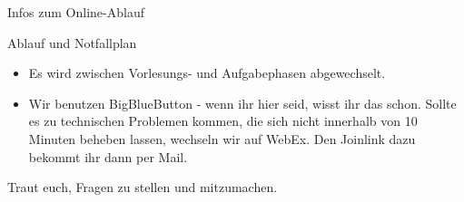 
\begin{frame}[fragile]{Infos zum Online-Ablauf}
	\begin{alertblock}{Ablauf und Notfallplan}
		\begin{itemize}
			\item Es wird zwischen Vorlesungs- und Aufgabephasen abgewechselt.
			\item Wir benutzen BigBlueButton - wenn ihr hier seid, wisst ihr das schon. Sollte es zu technischen Problemen kommen, die sich nicht innerhalb von 10 Minuten beheben lassen, wechseln wir auf WebEx. Den Joinlink dazu bekommt ihr dann per Mail.
		\end{itemize}
		\alert{Traut euch, Fragen zu stellen und mitzumachen.}
	\end{alertblock}
\end{frame}
